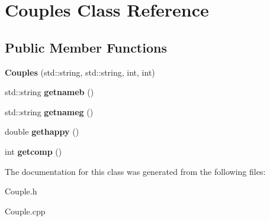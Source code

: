 \hypertarget{classCouples}{}\section{Couples Class Reference}
\label{classCouples}
\subsection*{Public Member Functions}
\begin{DoxyCompactItemize}
\item 
{\bfseries Couples} (std\+::string, std\+::string, int, int)\hypertarget{classCouples_a9fc8017d1f7f165e0b3d47f9102efe1a}{}\label{classCouples_a9fc8017d1f7f165e0b3d47f9102efe1a}

\item 
std\+::string {\bfseries getnameb} ()\hypertarget{classCouples_a13b092ee3c7a23a959396ff5b4227963}{}\label{classCouples_a13b092ee3c7a23a959396ff5b4227963}

\item 
std\+::string {\bfseries getnameg} ()\hypertarget{classCouples_a6495e286cd00db18ee15e750c6cf641f}{}\label{classCouples_a6495e286cd00db18ee15e750c6cf641f}

\item 
double {\bfseries gethappy} ()\hypertarget{classCouples_aa60011a4380f7908e71b7e185d9f0791}{}\label{classCouples_aa60011a4380f7908e71b7e185d9f0791}

\item 
int {\bfseries getcomp} ()\hypertarget{classCouples_a836075928867ff7d9e0ac1ea868eb459}{}\label{classCouples_a836075928867ff7d9e0ac1ea868eb459}

\end{DoxyCompactItemize}


The documentation for this class was generated from the following files\+:\begin{DoxyCompactItemize}
\item 
Couple.\+h\item 
Couple.\+cpp\end{DoxyCompactItemize}
